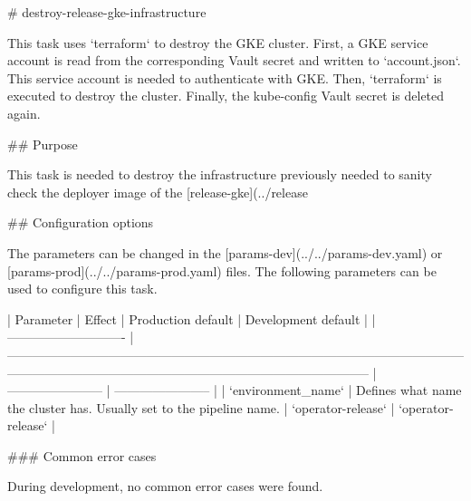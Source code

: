 # destroy-release-gke-infrastructure

This task uses `terraform` to destroy the GKE cluster.
First, a GKE service account is read from the corresponding Vault secret and written to `account.json`.
This service account is needed to authenticate with GKE.
Then, `terraform` is executed to destroy the cluster.
Finally, the kube-config Vault secret is deleted again.

## Purpose

This task is needed to destroy the infrastructure previously needed to sanity check the deployer image of the [release-gke](../release%

## Configuration options

The parameters can be changed in the [params-dev](../../params-dev.yaml) or [params-prod](../../params-prod.yaml) files.
The following parameters can be used to configure this task.

| Parameter                    | Effect                                                                                                                                                                                             | Production default      | Development default     |
| ---------------------------- | -------------------------------------------------------------------------------------------------------------------------------------------------------------------------------------------------- | ----------------------- | ----------------------- |
| `environment_name`           | Defines what name the cluster has. Usually set to the pipeline name.                                                                                                                               | `operator-release`      | `operator-release`      |

### Common error cases

During development, no common error cases were found.
